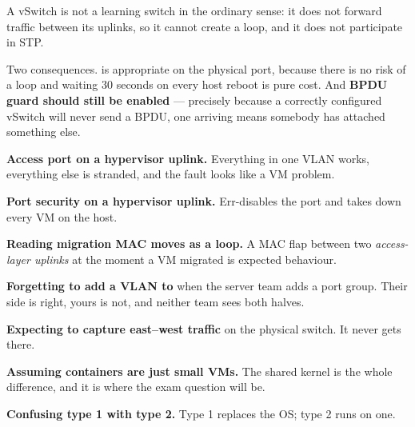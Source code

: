 \begin{alertbox}
A vSwitch is not a learning switch in the ordinary sense: it does not forward
traffic between its uplinks, so it cannot create a loop, and it does not
participate in STP.

Two consequences.  is appropriate on the
physical port, because there is no risk of a loop and waiting 30 seconds on every
host reboot is pure cost. And \textbf{BPDU guard should still be enabled} ---
precisely because a correctly configured vSwitch will never send a BPDU, one
arriving means somebody has attached something else.
\end{alertbox}

\begin{pitfall}
\begin{tight}
  \item \textbf{Access port on a hypervisor uplink.} Everything in one VLAN
        works, everything else is stranded, and the fault looks like a VM
        problem.
  \item \textbf{Port security on a hypervisor uplink.} Err-disables the port and
        takes down every VM on the host.
  \item \textbf{Reading migration MAC moves as a loop.} A MAC flap between two
        \emph{access-layer uplinks} at the moment a VM migrated is expected
        behaviour.
  \item \textbf{Forgetting to add a VLAN to } when the server team
        adds a port group. Their side is right, yours is not, and neither team
        sees both halves.
  \item \textbf{Expecting to capture east--west traffic} on the physical switch.
        It never gets there.
  \item \textbf{Assuming containers are just small VMs.} The shared kernel is the
        whole difference, and it is where the exam question will be.
  \item \textbf{Confusing type 1 with type 2.} Type 1 replaces the OS; type 2
        runs on one.
\end{tight}
\end{pitfall}

